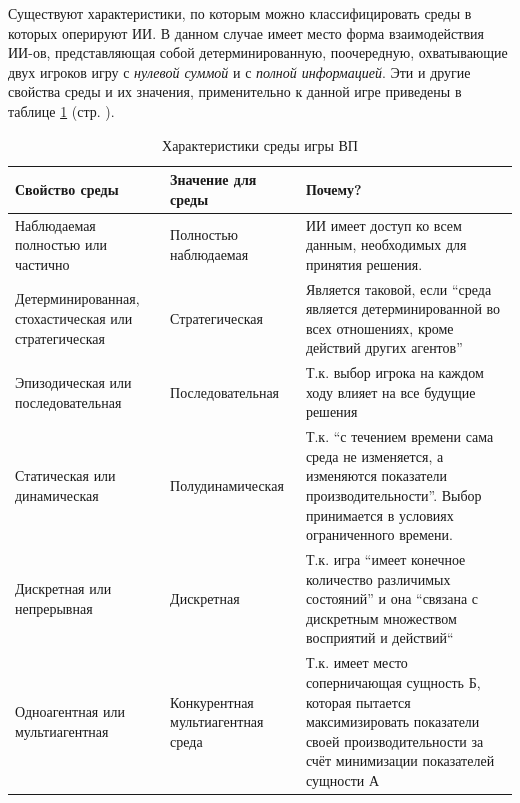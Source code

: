 \documentclass[12pt]{report}
\begin{document}
Существуют характеристики, по которым можно классифицировать среды в которых оперируют ИИ. \citep{russell1995} В данном случае имеет место форма взаимодействия ИИ-ов, представляющая собой детерминированную, поочередную, охватывающие двух игроков игру с \emph{нулевой суммой} и с \emph{полной информацией}. \citep{russell1995, morgenstern1947} Эти и другие свойства среды и их значения, применительно к данной игре приведены в таблице \ref{tab:evn_properties} (стр. \pageref{tab:evn_properties}).

\begin{table}[h!]
	\centering
	\begin{tabular}{ | p{3.6cm} | p{3cm} | p{7.2cm} |}	
	\hline
	Свойство среды & \raggedright Значение для среды & Почему? \\ \hline \hline
	\raggedright Наблюдаемая полностью или частично & \raggedright Полностью наблюдаемая & ИИ имеет доступ ко всем данным, необходимых для принятия решения. \\ \hline
	\raggedright Детерминированная, стохастическая или стратегическая & \raggedright Стратегическая &  Является таковой, если ``среда является детерминированной во всех отношениях, кроме действий других агентов''\citep{russell1995} \\ \hline
	\raggedright Эпизодическая или последовательная & \raggedright После\-до\-ва\-тель\-ная & Т.к. выбор игрока на каждом ходу влияет на все будущие решения \\ \hline
	\raggedright Статическая или динамическая & \raggedright Полуди\-на\-ми\-чес\-кая & Т.к. ``с течением времени сама среда не изменяется, а изменяются показатели производительности''. \citep{russell1995} Выбор принимается в условиях ограниченного времени. \\ \hline
	\raggedright Дискретная или непрерывная & \raggedright Дискретная & Т.к. игра ``имеет конечное количество различимых состояний'' и она ``связана с дискретным множеством восприятий и действий`` \citep{russell1995} \\ \hline
	\raggedright Одноагентная или мультиагентная & \raggedright Конкурентная мультиагентная среда & Т.к. имеет место соперничающая сущность Б, которая пытается максимизировать показатели своей производительности за счёт минимизации показателей сущности А \\ \hline
	\end{tabular}
	\caption{Характеристики среды игры ВП}
	\label{tab:evn_properties}
\end{table}
\end{document}
